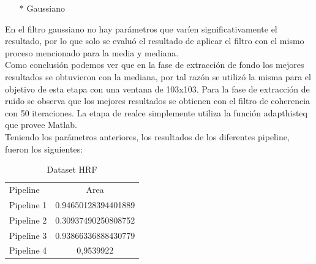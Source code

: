 \begin{itemize}
	\item[$*$]Gaussiano
\end{itemize}

En el filtro gaussiano no hay parámetros que varíen significativamente el resultado, por lo que solo se evaluó el resultado de aplicar el filtro con el mismo proceso mencionado para la media y mediana.\\


Como conclusi\'on podemos ver que en la fase de extracci\'on de fondo los mejores resultados se obtuvieron con la mediana, por tal raz\'on se utiliz\'o la misma para el objetivo de esta etapa con una ventana de 103x103. Para la fase de extracci\'on de ruido se observa que los mejores resultados se obtienen con el filtro de coherencia con 50 iteraciones. La etapa de realce simplemente utiliza la funci\'on adapthisteq que provee Matlab.\\

Teniendo los par\'ametros  anteriores, los resultados de los diferentes pipeline, fueron los siguientes:\\


\begin{table}[!ht]
  \begin{center}
    \begin{tabular}{| l c |}
    \hline
    Pipeline &   Area \\
    Pipeline 1 & 0.94650128394401889\\
    Pipeline 2 & 0.30937490250808752\\
    Pipeline 3 & 0.93866336888430779\\
    Pipeline 4 & 0,9539922\\
    \hline
    \end{tabular}
  \end{center}
  \caption{Dataset HRF}
\end{table}



